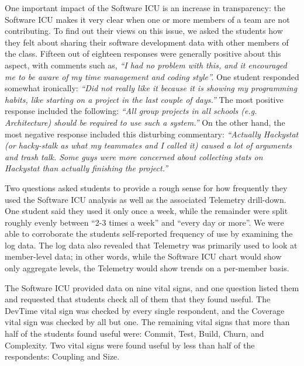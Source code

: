 \documentclass[times,10pt,twocolumn]{article}
\begin{document}
One important impact of the Software ICU is an increase in transparency:
the Software ICU makes it very clear when one or more members of a team are
not contributing.  To find out their views on this issue, we asked the
students how they felt about sharing their software development data with
other members of the class.  Fifteen out of eighteen responses were
generally positive about this aspect, with comments such as, {\em ``I had
no problem with this, and it encouraged me to be aware of my time
management and coding style''.}  One student responded somewhat ironically:
{\em ``Did not really like it because it is showing my programming habits,
like starting on a project in the last couple of days.''}  The most
positive response included the following: {\em ``All group projects in all
schools (e.g. Architecture) should be required to use such a system.''}  On
the other hand, the most negative response included this disturbing
commentary: {\em ``Actually Hackystat (or hacky-stalk as what my teammates
and I called it) caused a lot of arguments and trash talk.  Some guys were
more concerned about collecting stats on Hackystat than actually finishing
the project.''}


Two questions asked students to provide a rough sense for how frequently
they used the Software ICU analysis as well as the associated Telemetry
drill-down.  One student said they used it only once a week, while the
remainder were split roughly evenly between ``2-3 times a week'' and
``every day or more''.  We were able to corroborate the students
self-reported frequency of use by examining the log data.  The log data
also revealed that Telemetry was primarily used to look at member-level
data; in other words, while the Software ICU chart would show only
aggregate levels, the Telemetry would show trends on a per-member basis.


The Software ICU provided data on nine vital signs, and one question listed
them and requested that students check all of them that they found useful.
The DevTime vital sign was checked by every single respondent, and the
Coverage vital sign was checked by all but one.  The remaining vital signs
that more than half of the students found useful were: Commit, Test, Build,
Churn, and Complexity.  Two vital signs were found useful by less than half of the
respondents: Coupling and Size.
\end{document}
